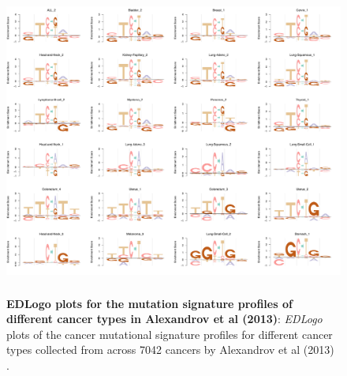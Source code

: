 \documentclass{bmcart}
\begin{document}
\begin{figure}[h!]
\centering
\includegraphics[height=4in, width=5in]{suppfig/Figure4.pdf}
\caption{\textbf{EDLogo plots for the mutation signature profiles of different cancer types in Alexandrov et al (2013)}: 
 \textit{EDLogo} plots of the cancer mutational signature profiles for different cancer types collected from across 7042 cancers by Alexandrov et al (2013) \cite{Alexandrov2013}.}
\label{fig:suppfig4}
\end{figure}
\end{document}
